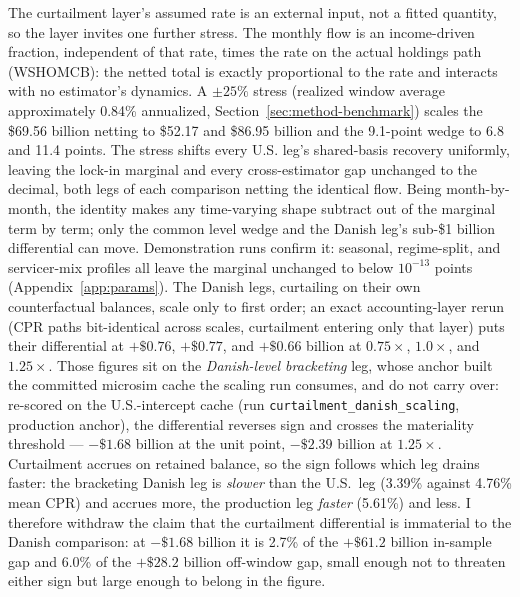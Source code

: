 \documentclass[12pt]{article}
\begin{document}
The curtailment layer's assumed rate is an external input, not a fitted quantity, so the layer invites one further stress. The monthly flow is an income-driven fraction, independent of that rate, times the rate on the actual holdings path (WSHOMCB): the netted total is exactly proportional to the rate and interacts with no estimator's dynamics. A $\pm 25\%$ stress (realized window average approximately 0.84\% annualized, Section~\ref{sec:method-benchmark}) scales the \$69.56 billion netting to \$52.17 and \$86.95 billion and the 9.1-point wedge to 6.8 and 11.4 points. The stress shifts every U.S. leg's shared-basis recovery uniformly, leaving the lock-in marginal and every cross-estimator gap unchanged to the decimal, both legs of each comparison netting the identical flow. Being month-by-month, the identity makes any time-varying shape subtract out of the marginal term by term; only the common level wedge and the Danish leg's sub-\$1 billion differential can move. Demonstration runs confirm it: seasonal, regime-split, and servicer-mix profiles all leave the marginal unchanged to below $10^{-13}$ points (Appendix~\ref{app:params}). The Danish legs, curtailing on their own counterfactual balances, scale only to first order; an exact accounting-layer rerun (CPR paths bit-identical across scales, curtailment entering only that layer) puts their differential at $+\$0.76$, $+\$0.77$, and $+\$0.66$ billion at $0.75\times$, $1.0\times$, and $1.25\times$. Those figures sit on the \emph{Danish-level bracketing} leg, whose anchor built the committed microsim cache the scaling run consumes, and do not carry over: re-scored on the U.S.-intercept cache (run \texttt{curtailment\_danish\_scaling}, production anchor), the differential reverses sign and crosses the materiality threshold --- $-\$1.68$ billion at the unit point, $-\$2.39$ billion at $1.25\times$. Curtailment accrues on retained balance, so the sign follows which leg drains faster: the bracketing Danish leg is \emph{slower} than the U.S.\ leg (3.39\% against 4.76\% mean CPR) and accrues more, the production leg \emph{faster} (5.61\%) and less. I therefore withdraw the claim that the curtailment differential is immaterial to the Danish comparison: at $-\$1.68$ billion it is 2.7\% of the $+\$61.2$ billion in-sample gap and 6.0\% of the $+\$28.2$ billion off-window gap, small enough not to threaten either sign but large enough to belong in the figure.
\end{document}
